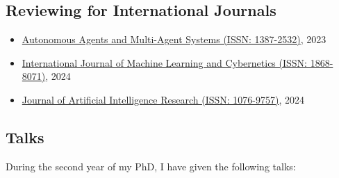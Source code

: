 \documentclass[11pt]{article}
\begin{document}
\subsection{Reviewing for International Journals}\label{subsec:reviewing-for-international-journals}

\begin{itemize}
	\item \href{https://link.springer.com/journal/10458}{Autonomous Agents and Multi-Agent Systems (ISSN: 1387-2532)}, 2023
	\item \href{https://link.springer.com/journal/13042}{International Journal of Machine Learning and Cybernetics (ISSN: 1868-8071)}, 2024
	\item \href{https://www.jair.org/index.php/jair/index}{Journal of Artificial Intelligence Research (ISSN: 1076-9757)}, 2024
\end{itemize}


\subsection{Talks}\label{subsec:talks}

During the second year of my PhD, I have given the following talks:
\end{document}
